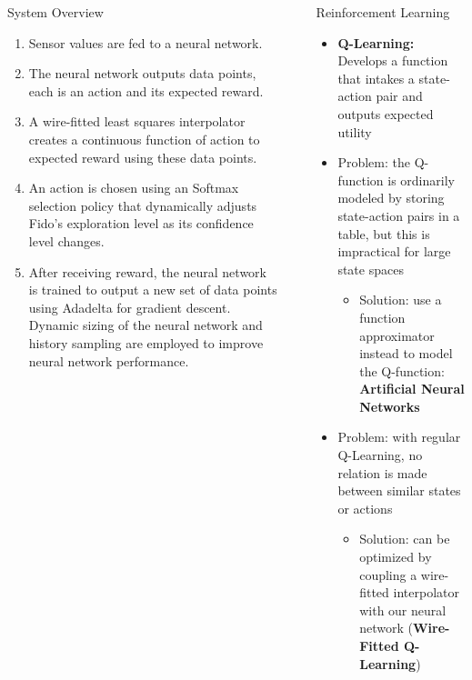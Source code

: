 \documentclass[final]{beamer}
\newlength{\sepwid}
\newlength{\onecolwid}
\newlength{\twocolwid}
\begin{document}
\begin{frame}[t]
\begin{columns}[t]
\begin{column}{\onecolwid}
\begin{block}{System Overview}
		\begin{enumerate}
			\item Sensor values are fed to a neural network.
			\item The neural network outputs data points, each is an action and its expected reward.
			\item A wire-fitted least squares interpolator creates a continuous function of action to expected reward using these data points.
			\item An action is chosen using an Softmax selection policy that dynamically adjusts Fido's exploration level as its confidence level changes.
			\item After receiving reward, the neural network is trained to output a new set of data points using Adadelta for gradient descent. Dynamic sizing of the neural network and history sampling are employed to improve neural network performance.
		\end{enumerate}
	\end{block}

\end{column}

\begin{column}{\sepwid}\end{column}

\begin{column}{\twocolwid}

\vspace{-1.65cm}

\begin{columns}[t,totalwidth=\twocolwid]

	\begin{column}{\onecolwid}
		\begin{block}{Reinforcement Learning}
			\begin{itemize}
				\item \textbf{Q-Learning:} Develops a function that intakes a state-action pair and outputs expected utility
				\item Problem: the Q-function is ordinarily modeled by storing state-action pairs in a table, but this is impractical for large state spaces
				\begin{itemize}
					\item Solution: use a function approximator instead to model the Q-function: \textbf{Artificial Neural Networks}
				\end{itemize}
				\item Problem: with regular Q-Learning, no relation is made between similar states or actions
				\begin{itemize}
					\item Solution: can be optimized by coupling a wire-fitted interpolator with our neural network (\textbf{Wire-Fitted Q-Learning})
				\end{itemize}


\end{itemize}
\end{block}
\end{column}
\end{columns}
\end{column}
\end{columns}
\end{frame}
\end{document}
